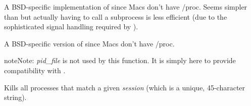 \documentclass[letterpaper,10pt,openany]{sphinxmanual}
\begin{document}

\begin{fulllineitems}
\label{Developer/utils:gateone.core.utils.kill_dtached_proc_bsd}
A BSD-specific implementation of {\hyperref[Developer/utils:gateone.core.utils.kill_dtached_proc]{}} since Macs don't have
/proc.  Seems simpler than {\hyperref[Developer/utils:gateone.core.utils.kill_dtached_proc]{}} but actually having to
call a subprocess is less efficient (due to the sophisticated signal
handling required by {\hyperref[Developer/utils:gateone.core.utils.shell_command]{}}).

\end{fulllineitems}


\begin{fulllineitems}
\label{Developer/utils:gateone.core.utils.killall_bsd}
A BSD-specific version of {\hyperref[Developer/utils:gateone.core.utils.killall]{}} since Macs don't have /proc.

\begin{notice}{note}{Note:}
\emph{pid\_file} is not used by this function.  It is simply here to provide
compatibility with {\hyperref[Developer/utils:gateone.core.utils.killall]{}}.
\end{notice}

\end{fulllineitems}


\begin{fulllineitems}
\label{Developer/utils:gateone.core.utils.kill_session_processes}
Kills all processes that match a given \emph{session} (which is a unique,
45-character string).

\end{fulllineitems}

\end{document}
